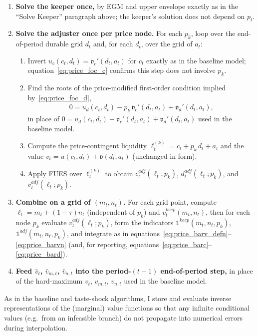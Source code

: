 \begin{enumerate}
	\item \textbf{Solve the keeper once,} by EGM and upper envelope exactly as in the ``Solve Keeper'' paragraph above; the keeper's solution does not depend on $p_t$.
	\item \textbf{Solve the adjuster once per price node.} For each $p_k$, loop over the end-of-period durable grid $d_t$ and, for each $d_t$, over the grid of $a_t$:
	\begin{enumerate}
		\item Invert $u_c(c_t,d_t)=\mathfrak{v}_c'(d_t,a_t)$ for $c_t$ exactly as in the baseline model; equation~\eqref{eq:price_foc_c} confirms this step does not involve $p_k$.
		\item Find the roots of the price-modified first-order condition implied by~\eqref{eq:price_foc_d},
		\begin{align}
			0 = u_d(c_t,d_t) - p_k\,\mathfrak{v}_c'(d_t,a_t) + \mathfrak{v}_d'(d_t,a_t),
		\end{align}
		in place of $0=u_d(c_t,d_t)-\mathfrak{v}_c'(d_t,a_t)+\mathfrak{v}_d'(d_t,a_t)$ used in the baseline model.
		\item Compute the price-contingent liquidity $\ell_t^{(k)} = c_t + p_k\, d_t + a_t$ and the value $v_t = u(c_t,d_t)+\mathfrak{v}(d_t,a_t)$ (unchanged in form).
		\item Apply FUES over $\ell_t^{(k)}$ to obtain $c_t^{adj}(\ell_t;p_k)$, $d_t^{adj}(\ell_t;p_k)$, and $v_t^{adj}(\ell_t;p_k)$.
	\end{enumerate}
	\item \textbf{Combine on a grid of $(m_t,n_t)$.} For each grid point, compute $\ell_t=m_t+(1-\tau)n_t$ (independent of $p_k$) and $v_t^{keep}(m_t,n_t)$, then for each node $p_k$ evaluate $v_t^{adj}(\ell_t;p_k)$, form the indicators $\mathbb{1}^{keep}(m_t,n_t,p_k)$, $\mathbb{1}^{adj}(m_t,n_t,p_k)$, and integrate as in equations~\eqref{eq:price_barv_defn}--\eqref{eq:price_barvn} (and, for reporting, equations~\eqref{eq:price_barc}--\eqref{eq:price_bard}).
	\item \textbf{Feed $\bar v_t$, $\bar v_{m,t}$, $\bar v_{n,t}$ into the period-$(t-1)$ end-of-period step,} in place of the hard-maximum $v_t$, $v_{m,t}$, $v_{n,t}$ used in the baseline model.
\end{enumerate}
As in the baseline and taste-shock algorithms, I store and evaluate inverse representations of the (marginal) value functions so that any infinite conditional values (e.g.\ from an infeasible branch) do not propagate into numerical errors during interpolation.


